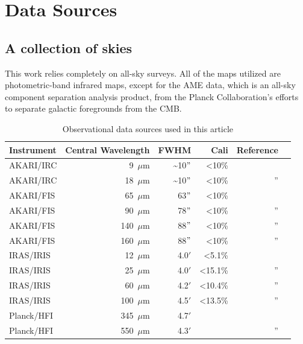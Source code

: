 \section{Data Sources}
  \label{ch:datasources}

  \subsection{A collection of skies}
    This work relies completely on all-sky surveys. All of the maps utilized are photometric-band infrared maps, except for the AME data, which is an all-sky component separation analysis product, from the Planck Collaboration's efforts to separate galactic foregrounds from the CMB.


    \begin{table}
      \label{tab:data}
      \caption{Observational data sources used in this article}
      \centering
        \begin{tabular}{lrrrrr}
        \hline\hline
        Instrument & Central Wavelength & FWHM & Cali & Reference \\
        \hline
        AKARI/IRC & 9~$\mu$m  &  \~{}10$"$ & \textless 10\%   & \citep{ishihara10} \\
        AKARI/IRC & 18~$\mu$m & \~{}10$"$  & \textless 10\%     & '' \\
        AKARI/FIS & 65~$\mu$m  & 63$"$ & \textless 10\% & \citep{doi15,takita16} \\
        AKARI/FIS & 90~$\mu$m  & 78$"$ & \textless 10\%   & '' \\
        AKARI/FIS & 140~$\mu$m & 88$"$ & \textless 10\%   & '' \\
        AKARI/FIS & 160~$\mu$m & 88$"$ & \textless 10\%   & '' \\
        IRAS/IRIS & 12~$\mu$m   & 4.0$'$ &   \textless 5.1\%       & \citep{iris05} \\
        IRAS/IRIS & 25~$\mu$m   & 4.0$'$ &    \textless 15.1\%      & ''\\
        IRAS/IRIS & 60~$\mu$m   & 4.2$'$ &    \textless 10.4\%      & '' \\
        IRAS/IRIS & 100~$\mu$m  & 4.5$'$ &   \textless 13.5\%       & '' \\
        Planck/HFI & 345~$\mu$m & 4.7$'$ & & \citep{hfi14viii} \\
        Planck/HFI & 550~$\mu$m & 4.3$'$& & '' \\
        \hline
      \end{tabular}
    \end{table}

